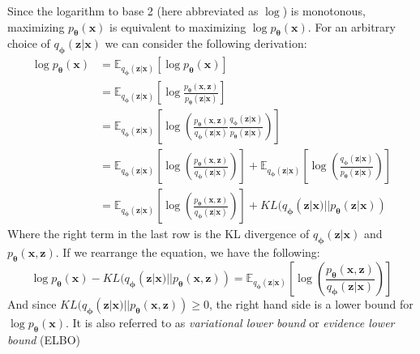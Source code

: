 \documentclass[12pt]{report}
\begin{document}
Since the logarithm to base 2 (here abbreviated as $\log$) is monotonous, maximizing $p_{\mathbf{\theta}}(\mathbf{x})$ is equivalent to maximizing $\log p_{\mathbf{\theta}}(\mathbf{x})$. For an arbitrary choice of $q_{\mathbf{\phi}}(\mathbf{z}|\mathbf{x})$ we can consider the following derivation:
\begin{equation}
\begin{split}
	\log p_{\mathbf{\theta}}(\mathbf{x}) 
	& = \mathbb{E}_{q_{\mathbf{\phi}}(\mathbf{z}|\mathbf{x})}\left[\log p_{\mathbf{\theta}}(\mathbf{x})\right] \\
	& = \mathbb{E}_{q_{\mathbf{\phi}}(\mathbf{z}|\mathbf{x})}\left[ \log \frac{p_{\mathbf{\theta}}(\mathbf{x}, \mathbf{z})}{p_{\mathbf{\theta}}(\mathbf{z}|\mathbf{x})} \right] \\
	& = \mathbb{E}_{q_{\mathbf{\phi}}(\mathbf{z}|\mathbf{x})}\left[ \log\left(\frac{p_{\mathbf{\theta}}(\mathbf{x}, \mathbf{z})}{q_{\mathbf{\phi}}(\mathbf{z}|\mathbf{x})}\frac{q_{\mathbf{\phi}}(\mathbf{z}|\mathbf{x})}{p_{\mathbf{\theta}}(\mathbf{z}|\mathbf{x})} \right) \right] \\
	& = \mathbb{E}_{q_{\mathbf{\phi}}(\mathbf{z}|\mathbf{x})}\left[ \log\left(\frac{p_{\mathbf{\theta}}(\mathbf{x}, \mathbf{z})}{q_{\mathbf{\phi}}(\mathbf{z}|\mathbf{x})}\right) \right] + \mathbb{E}_{q_{\mathbf{\phi}}(\mathbf{z}|\mathbf{x})}\left[ \log\left(\frac{q_{\mathbf{\phi}}(\mathbf{z}|\mathbf{x})}{p_{\mathbf{\theta}}(\mathbf{z}|\mathbf{x})} \right) \right] \\
	& = \mathbb{E}_{q_{\mathbf{\phi}}(\mathbf{z}|\mathbf{x})}\left[ \log\left(\frac{p_{\mathbf{\theta}}(\mathbf{x}, \mathbf{z})}{q_{\mathbf{\phi}}(\mathbf{z}|\mathbf{x})}\right) \right] + KL(q_{\mathbf{\phi}}(\mathbf{z}|\mathbf{x}) || p_{\mathbf{\theta}}(\mathbf{z}| \mathbf{x})) 
\end{split}
\end{equation}
Where the right term in the last row is the KL divergence of $q_{\mathbf{\phi}}(\mathbf{z}|\mathbf{x})$ and $p_{\mathbf{\theta}}(\mathbf{x}, \mathbf{z})$. If we rearrange the equation, we have the following:
\begin{equation}
	\log p_{\mathbf{\theta}}(\mathbf{x}) - KL(q_{\mathbf{\phi}}(\mathbf{z}|\mathbf{x}) || p_{\mathbf{\theta}}(\mathbf{x}, \mathbf{z})) = \mathbb{E}_{q_{\mathbf{\phi}}(\mathbf{z}|\mathbf{x})}\left[ \log\left(\frac{p_{\mathbf{\theta}}(\mathbf{x}, \mathbf{z})}{q_{\mathbf{\phi}}(\mathbf{z}|\mathbf{x})}\right) \right]
\end{equation}
	And since $KL(q_{\mathbf{\phi}}(\mathbf{z}|\mathbf{x}) || p_{\mathbf{\theta}}(\mathbf{x}, \mathbf{z})) \geq 0$, the right hand side is a lower bound for $\log p_{\mathbf{\theta}}(\mathbf{x})$. It is also referred to as \emph{variational lower bound} or \emph{evidence lower bound} (ELBO) 
\end{document}
